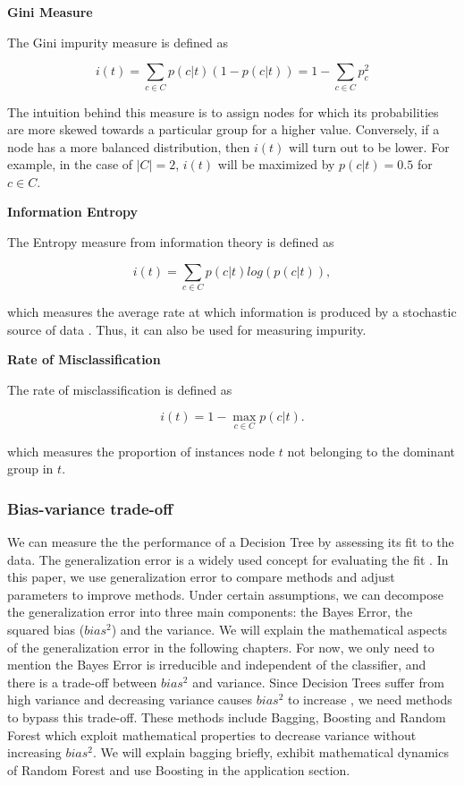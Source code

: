 \textbf{Gini Measure}

The Gini impurity measure is defined as 


\begin{equation}
    i(t) = \sum_{c \in C} p(c|t) (1 - p(c|t)) = 1 - \sum_{c \in C} p_{c}^{2}
\end{equation}

The intuition behind this measure is to assign nodes 
for which its probabilities are more skewed towards a particular group for a higher value.
Conversely, if a node has a more balanced distribution, then \(i(t)\) will turn out to be lower.
For example, in the case of \( |C|=2 \), \(i(t)\) will be maximized by \( p(c|t) = 0.5 \) for \( c \in C \).


\textbf{Information Entropy}

The Entropy measure from information theory is defined as

\begin{equation}
    i(t) = \sum_{c \in C} p(c|t) log(p(c|t)),
\end{equation}

which measures the average rate at which information is produced by a stochastic source of data .
Thus, it can also be used for measuring impurity.


\textbf{Rate of Misclassification}

The rate of misclassification is defined as 

\begin{equation}
    i(t) = 1 - \max_{c \in C} p(c|t) .
\end{equation}

which measures the proportion of instances node \(t\) not belonging to the dominant group in \(t\).


\subsubsection{Bias-variance trade-off}
We can measure the the performance of a Decision Tree by assessing its fit to the data. 
The generalization error is a widely used concept for evaluating the fit \cite{breiman2001random}.
In this paper, we use generalization error to compare methods and adjust parameters to improve methods. 
Under certain assumptions, we can decompose the generalization error into three main components:
the Bayes Error, the squared bias ($bias^2$) and the variance. 
We will explain the mathematical aspects of the generalization error in the following chapters. 
For now, we only need to mention the Bayes Error is irreducible and independent of the classifier, 
and there is a trade-off between $bias^2$ and variance. Since Decision Trees suffer from high variance and 
decreasing variance causes $bias^2$ to increase \cite{geman1992neural}, we need methods to bypass this trade-off. 
These methods include Bagging, Boosting and Random Forest 
which exploit mathematical properties to decrease variance without increasing $bias^2$. 
We will explain bagging briefly, exhibit mathematical dynamics of Random Forest and 
use Boosting in the application section.


